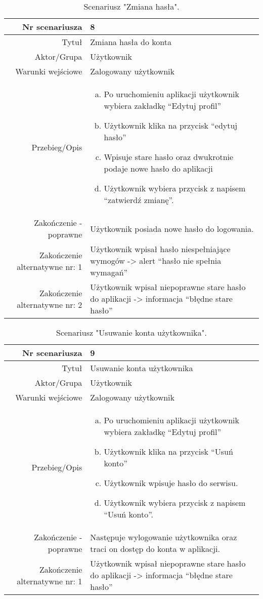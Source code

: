 \documentclass[12pt,a4paper]{article}
\begin{document}
\begin{table} [H]
\centering
\begin{tabular}{|r|p{9cm}|} \hline
Nr scenariusza & 8 \\
\hline
Tytuł & Zmiana hasła do konta \\
\hline
Aktor/Grupa & Użytkownik \\
\hline
Warunki wejściowe & Zalogowany użytkownik \\
\hline
Przebieg/Opis & 
\begin{enumerate}[a)]
\item Po uruchomieniu aplikacji użytkownik wybiera zakładkę “Edytuj profil”
\item Użytkownik klika na przycisk “edytuj hasło”
\item Wpisuje stare hasło oraz dwukrotnie podaje nowe hasło do aplikacji
\item Użytkownik wybiera przycisk z napisem “zatwierdź zmianę”.

\end{enumerate}
\\
\hline
Zakończenie - poprawne & Użytkownik posiada nowe hasło do logowania.
\\ 
\hline
Zakończenie alternatywne nr: 1 & Użytkownik wpisał hasło niespełniające wymogów -> alert “hasło nie spełnia wymagań”
\\
\hline
Zakończenie alternatywne nr: 2 & Użytkownik wpisał niepoprawne stare hasło do aplikacji -> informacja “błędne stare hasło”
\\
\hline
\end{tabular}
\caption{Scenariusz "Zmiana hasła".}
\label{table:8}
\end{table}



\begin{table} []
\centering
\begin{tabular}{|r|p{9cm}|} \hline
Nr scenariusza & 9 \\
\hline
Tytuł & Usuwanie konta użytkownika \\
\hline
Aktor/Grupa & Użytkownik \\
\hline
Warunki wejściowe & Zalogowany użytkownik \\
\hline
Przebieg/Opis & 
\begin{enumerate}[a)]
\item Po uruchomieniu aplikacji użytkownik wybiera zakładkę “Edytuj profil”
\item Użytkownik klika na przycisk “Usuń konto”
\item Użytkownik wpisuje hasło do serwisu.
\item Użytkownik wybiera przycisk z napisem “Usuń konto”.
\end{enumerate}
\\
\hline
Zakończenie - poprawne & Następuje wylogowanie użytkownika oraz traci on dostęp do konta w aplikacji.
\\ 
\hline
Zakończenie alternatywne nr: 1 & Użytkownik wpisał niepoprawne stare hasło do aplikacji -> informacja “błędne stare hasło”
\\
\hline
\end{tabular}
\caption{Scenariusz "Usuwanie konta użytkownika".}
\label{table:9}
\end{table}
\end{document}
